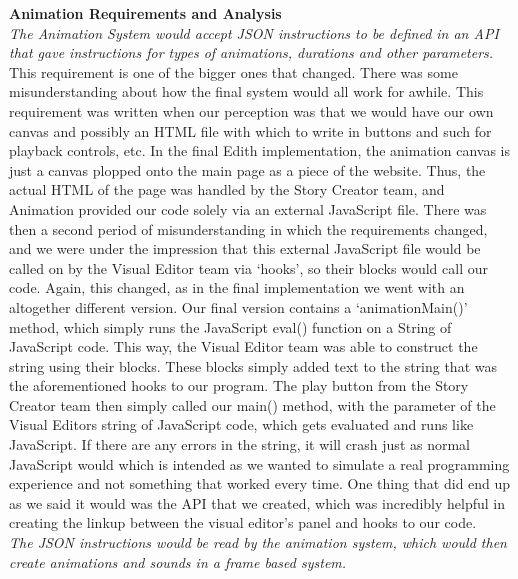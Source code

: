 \documentclass[12pt]{article}
\begin{document}
\noindent \textbf{Animation Requirements and Analysis}\\

\noindent\textit{The Animation System would accept JSON instructions to be defined in an API that gave instructions for types of animations, durations and other parameters.}\\

This requirement is one of the bigger ones that changed. There was some misunderstanding about how the final system would all work for awhile. This requirement was written when our perception was that we would have our own canvas and possibly an HTML file with which to write in buttons and such for playback controls, etc. In the final Edith implementation, the animation canvas is just a canvas plopped onto the main page as a piece of the website. Thus, the actual HTML of the page was handled by the Story Creator team, and Animation provided our code solely via an external JavaScript file. There was then a second period of misunderstanding in which the requirements changed, and we were under the impression that this external JavaScript file would be called on by the Visual Editor team via ‘hooks’, so their blocks would call our code. Again, this changed, as in the final implementation we went with an altogether different version. Our final version contains a ‘animationMain()’ method, which simply runs the JavaScript eval() function on a String of JavaScript code. This way, the Visual Editor team was able to construct the string using their blocks. These blocks simply added text to the string that was the aforementioned hooks to our program. The play button from the Story Creator team then simply called our main() method, with the parameter of the Visual Editors string of JavaScript code, which gets evaluated and runs like JavaScript. If there are any errors in the string, it will crash just as normal JavaScript would which is intended as we wanted to simulate a real programming experience and not something that worked every time. 
	One thing that did end up as we said it would was the API that we created, which was incredibly helpful in creating the linkup between the visual editor’s panel and hooks to our code. \\

\noindent\textit{The JSON instructions would be read by the animation system, which would then create animations and sounds in a frame based system.}\\
\end{document}
